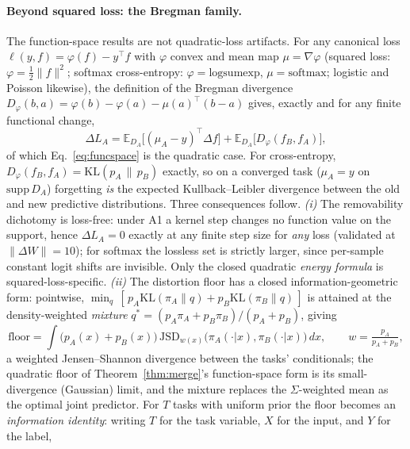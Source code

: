 \documentclass[10pt,a4paper]{article}
\theoremstyle{plain}
\theoremstyle{definition}
\newcommand{\Sig}{\Sigma}
\begin{document}
\paragraph{Beyond squared loss: the Bregman family.} The function-space results are not
quadratic-loss artifacts. For any canonical loss $\ell(y,f)=\varphi(f)-y^\top f$ with
$\varphi$ convex and mean map $\mu=\nabla\varphi$ (squared loss:
$\varphi=\tfrac12\|f\|^2$; softmax cross-entropy: $\varphi=\mathrm{logsumexp}$,
$\mu=\mathrm{softmax}$; logistic and Poisson likewise), the definition of the Bregman
divergence $D_\varphi(b,a)=\varphi(b)-\varphi(a)-\mu(a)^\top(b-a)$ gives, exactly and for
any finite functional change,
\begin{equation}
\Delta L_A=\mathbb{E}_{D_A}\!\big[(\mu_A-y)^\top\Delta\!f\big]
+\mathbb{E}_{D_A}\!\big[D_\varphi(f_B,f_A)\big],
\label{eq:bregman}
\end{equation}
of which Eq.~\eqref{eq:funcspace} is the quadratic case. For cross-entropy,
$D_\varphi(f_B,f_A)=\mathrm{KL}(p_A\,\|\,p_B)$ exactly, so on a converged task
($\mu_A=y$ on $\mathrm{supp}\,D_A$) forgetting \emph{is} the expected
Kullback--Leibler divergence between the old and new predictive distributions. Three
consequences follow. \emph{(i)} The removability dichotomy is loss-free: under A1 a
kernel step changes no function value on the support, hence $\Delta L_A=0$ exactly at
any finite step size for \emph{any} loss (validated at $\|\Delta W\|=10$); for softmax
the lossless set is strictly larger, since per-sample constant logit shifts are
invisible. Only the closed quadratic \emph{energy formula} is squared-loss-specific.
\emph{(ii)} The distortion floor has a closed information-geometric form: pointwise,
$\min_q\,[\,p_A\mathrm{KL}(\pi_A\|q)+p_B\mathrm{KL}(\pi_B\|q)\,]$ is attained at the
density-weighted \emph{mixture} $q^\ast=(p_A\pi_A+p_B\pi_B)/(p_A+p_B)$, giving
\begin{equation}
\text{floor}=\!\int\!\big(p_A(x)+p_B(x)\big)\,
\mathrm{JSD}_{w(x)}\!\big(\pi_A(\cdot|x),\pi_B(\cdot|x)\big)\,dx,
\qquad w=\tfrac{p_A}{p_A+p_B},
\label{eq:jsdfloor}
\end{equation}
a weighted Jensen--Shannon divergence between the tasks' conditionals; the quadratic
floor of Theorem~\ref{thm:merge}'s function-space form is its small-divergence
(Gaussian) limit, and the mixture replaces the $\Sig$-weighted mean as the optimal
joint predictor. For $T$ tasks with uniform prior the floor becomes an
\emph{information identity}: writing $T$ for the task variable, $X$ for the input, and
$Y$ for the label,
\end{document}
